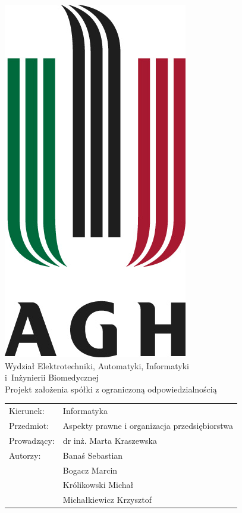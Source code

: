 \documentclass[a4paper,12pt,oneside]{article}
\begin{document}
	\begin{titlepage}
		\begin{center}
			\includegraphics[keepaspectratio]{agh.jpg}\\[0.5cm]
			{\large Wydział Elektrotechniki, Automatyki, Informatyki \\i~Inżynierii Biomedycznej}\\[0.5cm]
			{\huge Projekt założenia spółki z ograniczoną odpowiedzialnością}\\[1cm]
			\begin{table}[!h]
				\begin{tabular}{ll}
					Kierunek: & Informatyka \\
					Przedmiot: & Aspekty prawne i organizacja przedsiębiorstwa\\
					Prowadzący: & dr inż. Marta Kraszewska\\
					Autorzy: &Banaś Sebastian\\
					&Bogacz Marcin\\
					&Królikowski Michał\\
					&Michałkiewicz Krzysztof\\
				\end{tabular}
			\end{table}
		\end{center}
	\end{titlepage}

	\tableofcontents
	
	
	
	
	
	
\end{document}
